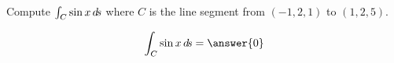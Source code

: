 \documentclass{ximera}
\author{David Guichard \and Neal Koblitz \and H. Jerome Keisler \and Albert Scheller \and Barry Balof \and Mike Wills \and Matthew Carr}
\begin{document}
\begin{exercise}




Compute $\int_C \sin x \mathop{}\!d\! s$ where $C$ is the line segment from $(-1,2,1)$ to $(1,2,5)$.

\begin{prompt}
\[
\int_C \sin x \d s=\answer{0}
\]
\end{prompt}



\end{exercise}
\end{document}
